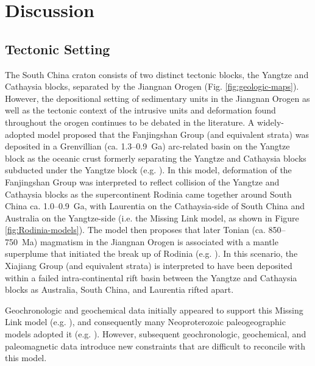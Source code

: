 \section{Discussion}

\subsection{Tectonic Setting}

The South China craton consists of two distinct tectonic blocks, the Yangtze and Cathaysia blocks, separated by the Jiangnan Orogen (Fig. \ref{fig:geologic-maps}). However, the depositional setting of sedimentary units in the Jiangnan Orogen as well as the tectonic context of the intrusive units and deformation found throughout the orogen continues to be debated in the literature. A widely-adopted model proposed that the Fanjingshan Group (and equivalent strata) was deposited in a Grenvillian (ca. 1.3--0.9~Ga) arc-related basin on the Yangtze block as the oceanic crust formerly separating the Yangtze and Cathaysia blocks subducted under the Yangtze block (e.g. \citealp{Li2002a, Li2009b}). In this model, deformation of the Fanjingshan Group was interpreted to reflect collision of the Yangtze and Cathaysia blocks as the supercontinent Rodinia came together around South China ca. 1.0--0.9~Ga, with Laurentia on the Cathaysia-side of South China and Australia on the Yangtze-side (i.e. the Missing Link model, as shown in Figure \ref{fig:Rodinia-models}). The model then proposes that later Tonian (ca. 850--750~Ma) magmatism in the Jiangnan Orogen is associated with a mantle superplume that initiated the break up of Rodinia (e.g. \citealp{Li2003a, Li2009b}). In this scenario, the Xiajiang Group (and equivalent strata) is interpreted to have been deposited within a failed intra-continental rift basin between the Yangtze and Cathaysia blocks as Australia, South China, and Laurentia rifted apart.

Geochronologic and geochemical data initially appeared to support this Missing Link model (e.g. \citealp{Li2002a, Li2003a, Li2009b}), and consequently many Neoproterozoic paleogeographic models adopted it (e.g. \citealp{Li2008a}). However, subsequent geochronologic, geochemical, and paleomagnetic data introduce new constraints that are difficult to reconcile with this model.

